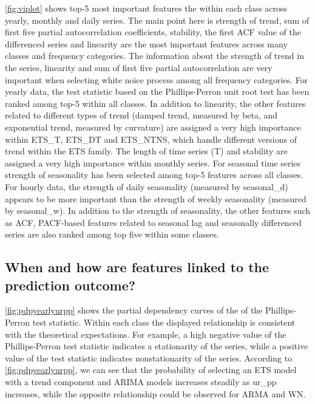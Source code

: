 \documentclass[11pt,a4paper,]{article}
\begin{document}
\autoref{fig:viplot} shows top-5 most important features the within each class across yearly, monthly and daily series. The main point here is strength of trend, sum of first five partial autocorrelation coefficients, stability, the first ACF value of the differenced series and linearity are the most important features across many classes and frequency categories. The information about the strength of trend in the series, linearity and sum of first five partial autocorrelation are very important when selecting white noice process among all frequency categories. For yearly data, the test statistic based on the Phillips-Perron unit root test has been ranked among top-5 within all classes. In addition to linearity, the other features related to different types of trend (damped trend, measured by beta, and exponential trend, measured by curvature) are assigned a very high importance within ETS\_T, ETS\_DT and ETS\_NTNS, which handle different versions of trend within the ETS family. The length of time series (T) and stability are assigned a very high importance within monthly series. For seasonal time series strength of seasonality has been selected among top-5 features across all classes. For hourly data, the strength of daily seasonality (measured by seasonal\_d) appears to be more important than the strength of weekly seasonality (measured by seasonal\_w). In addition to the strength of seasonality, the other features such as ACF, PACF-based features related to seasonal lag and seasonally differenced series are also ranked among top five within some classes.

\hypertarget{when-and-how-are-features-linked-to-the-prediction-outcome}{%
\subsection{When and how are features linked to the prediction outcome?}\label{when-and-how-are-features-linked-to-the-prediction-outcome}}

\autoref{fig:pdpyearlyurpp} shows the partial dependency curves of the of the Phillips-Perron test statistic.
Within each class the displayed relationship is consistent with the theoretical expectations. For example, a high negative value of the Phillips-Perron test statistic indicates a stationarity of the series, while a positive value of the test statistic indicates nonstationarity of the series. According to \autoref{fig:pdpyearlyurpp}, we can see that the probability of selecting an ETS model with a trend component and ARIMA models increases steadily as ur\_pp increases, while the opposite relationship could be observed for ARMA and WN.
\end{document}
